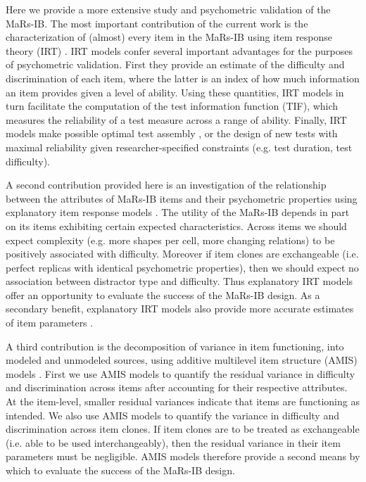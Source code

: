 \documentclass[a4paper,man,natbib]{apa6}
\begin{document}
Here we provide a more extensive study and psychometric validation of the MaRs-IB. The most important contribution of the current work is the characterization of (almost) every item in the MaRs-IB using item response theory (IRT) \citep{embretson2013item, de2013theory}. IRT models confer several important advantages for the purposes of psychometric validation. First they provide an estimate of the difficulty and discrimination of each item, where the latter is an index of how much information an item provides given a level of ability. Using these quantities, IRT models in turn facilitate the computation of the test information function (TIF), which measures the reliability of a test measure across a range of ability. Finally, IRT models make possible optimal test assembly  \citep{van1998optimal}, or the design of new tests with maximal reliability given researcher-specified constraints (e.g. test duration, test difficulty).

A second contribution provided here is an investigation of the relationship between the attributes of MaRs-IB items and their psychometric properties using explanatory item response models \citep{de2004explanatory, wilson2008explanatory}. The utility of the MaRs-IB depends in part on its items exhibiting certain expected characteristics. Across items we should expect complexity (e.g. more shapes per cell, more changing relations) to be positively associated with difficulty. Moreover if item clones are exchangeable (i.e. perfect replicas with identical psychometric properties), then we should expect no association between distractor type and difficulty. Thus explanatory IRT models offer an opportunity to evaluate the success of the MaRs-IB design. As a secondary benefit, explanatory IRT models also provide more accurate estimates of item parameters \citep{neuhaus2006separating}. 

A third contribution is the decomposition of variance in item functioning, into modeled and unmodeled sources, using additive multilevel item structure (AMIS) models \citep{geerlings2011modeling, cho2014additive, lathrop2017item}. First we use AMIS models to quantify the residual variance in difficulty and discrimination across items after accounting for their respective attributes. At the item-level, smaller residual variances indicate that items are functioning as intended. We also use AMIS models to quantify the variance in difficulty and discrimination across item clones. If item clones are to be treated as exchangeable (i.e. able to be used interchangeably), then the residual variance in their item parameters must be negligible. AMIS models therefore provide a second means by which to evaluate the success of the MaRs-IB design.
\end{document}

